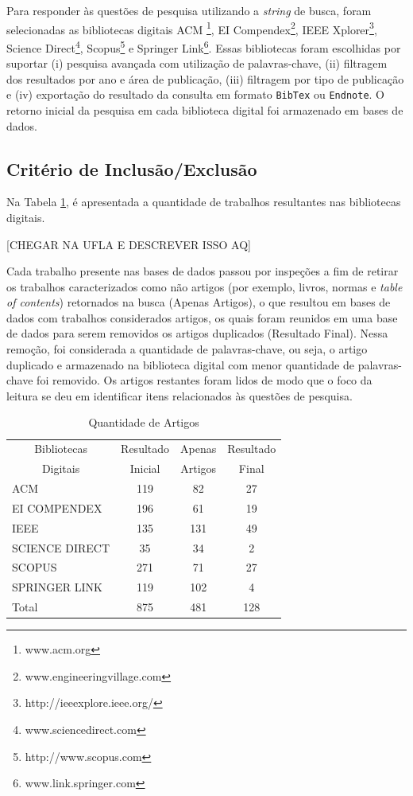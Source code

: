 Para responder às questões de pesquisa utilizando a \textit{string} de busca, foram selecionadas as bibliotecas digitais ACM \footnote{www.acm.org}, EI Compendex\footnote{www.engineeringvillage.com}, IEEE Xplorer\footnote{http://ieeexplore.ieee.org/}, Science Direct\footnote{www.sciencedirect.com}, Scopus\footnote{http://www.scopus.com} e Springer Link\footnote{www.link.springer.com}. Essas bibliotecas foram escolhidas por suportar (i) pesquisa avançada com utilização de palavras-chave, (ii) filtragem dos resultados por ano e área de publicação, (iii) filtragem por tipo de publicação e (iv) exportação do resultado da consulta em formato \texttt{BibTex} ou \texttt{Endnote}. O retorno inicial da pesquisa em cada biblioteca digital foi armazenado em bases de dados.

\subsection{Critério de Inclusão/Exclusão}
Na Tabela \ref{qntArtBase}, é apresentada a quantidade de trabalhos resultantes nas bibliotecas digitais. 

[CHEGAR NA UFLA E DESCREVER ISSO AQ]

Cada trabalho presente nas bases de dados passou por inspeções a fim de retirar os trabalhos caracterizados como não artigos (por exemplo, livros, normas e \textit{table of contents}) retornados na busca (Apenas Artigos), o que resultou em bases de dados com trabalhos considerados artigos, os quais foram reunidos em uma base de dados para serem removidos os artigos duplicados (Resultado Final). Nessa remoção, foi considerada a quantidade de palavras-chave, ou seja, o artigo duplicado e armazenado na biblioteca digital com menor quantidade de palavras-chave foi removido. Os artigos restantes foram lidos de modo que o foco da leitura se deu em identificar itens relacionados às questões de pesquisa.

\begin{table}[ht]
	\centering
	\caption{Quantidade de Artigos}
	\label{qntArtBase}
	\begin{tabular}{@{}lccc@{}}
		\toprule
		\multicolumn{1}{c}{Bibliotecas}    & Resultado        & Apenas      & Resultado     \\
		\multicolumn{1}{c}{Digitais}       & Inicial  & Artigos    &  Final \\
		\bottomrule
		ACM            & 119      & 82     & 27    \\
		EI COMPENDEX   & 196      & 61     & 19    \\
		IEEE           & 135      & 131    & 49    \\
		SCIENCE DIRECT & 35       & 34     & 2     \\ 
		SCOPUS         & 271      & 71     & 27    \\ 
		SPRINGER LINK  & 119      & 102    & 4     \\
		\bottomrule \toprule
		Total          & 875      & 481    & 128   \\ 
		\bottomrule
	\end{tabular}
\end{table}

